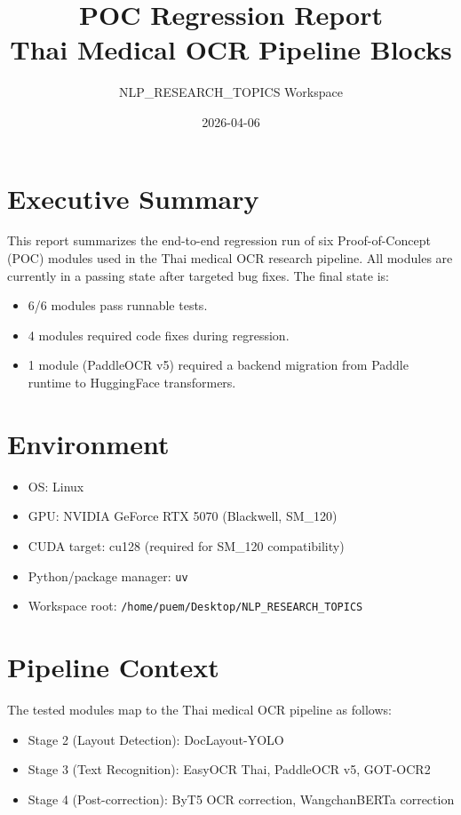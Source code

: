 \documentclass[11pt,a4paper]{article}
\title{POC Regression Report\\Thai Medical OCR Pipeline Blocks}
\author{NLP\_RESEARCH\_TOPICS Workspace}
\date{2026-04-06}
\begin{document}
\maketitle

\section{Executive Summary}
This report summarizes the end-to-end regression run of six Proof-of-Concept (POC) modules used in the Thai medical OCR research pipeline. All modules are currently in a passing state after targeted bug fixes. The final state is:
\begin{itemize}
  \item 6/6 modules pass runnable tests.
  \item 4 modules required code fixes during regression.
  \item 1 module (PaddleOCR v5) required a backend migration from Paddle runtime to HuggingFace transformers.
\end{itemize}

\section{Environment}
\begin{itemize}
  \item OS: Linux
  \item GPU: NVIDIA GeForce RTX 5070 (Blackwell, SM\_120)
  \item CUDA target: cu128 (required for SM\_120 compatibility)
  \item Python/package manager: \texttt{uv}
  \item Workspace root: \texttt{/home/puem/Desktop/NLP\_RESEARCH\_TOPICS}
\end{itemize}

\section{Pipeline Context}
The tested modules map to the Thai medical OCR pipeline as follows:
\begin{itemize}
  \item Stage 2 (Layout Detection): DocLayout-YOLO
  \item Stage 3 (Text Recognition): EasyOCR Thai, PaddleOCR v5, GOT-OCR2
  \item Stage 4 (Post-correction): ByT5 OCR correction, WangchanBERTa correction
\end{itemize}
\end{document}
